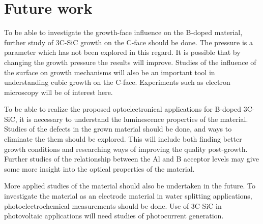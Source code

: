 
\chapter{Future work}
To be able to investigate the growth-face influence on the B-doped material, further study of 3C-SiC growth on the C-face should be done. The pressure is a parameter which has not been explored in this regard. It is possible that by changing the growth pressure the results will improve. Studies of the influence of the surface on growth mechanisms will also be an important tool in understanding cubic growth on the C-face. Experiments such as electron microscopy will be of interest here. 

To be able to realize the proposed optoelectronical applications for B-doped 3C-SiC, it is necessary to understand the luminescence properties of the material. Studies of the defects in the grown material should be done, and ways to eliminate the them should be explored. This will include both finding better growth conditions and researching ways of improving the quality post-growth. Further studies of the relationship between the Al and B acceptor levels may give some more insight into the optical properties of the material. 

More applied studies of the material should also be undertaken in the future. To investigate the material as an electrode material in water splitting applications, photoelectrochemical measurements should be done. Use of 3C-SiC in photovoltaic applications will need studies of photocurrent generation. 

